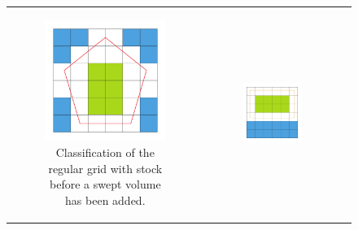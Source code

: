 \begin{figure}[h]
	\centering
	\begin{tabular}{ccc}
		\begin{subfigure}[t]{0.3\textwidth}
			\centering
			\includegraphics[width=\textwidth]{images/classification_before}
			\caption{Classification of the regular grid with stock before a swept volume has been added.}
			\label{fig:classification_before}
		\end{subfigure}&
		\begin{subfigure}[t]{0.3\textwidth}
			\centering
			\includegraphics[width=\textwidth]{images/classification_sv}

\end{subfigure}
\end{tabular}
\end{figure}

